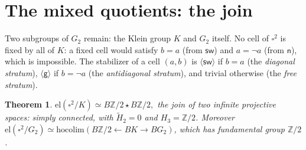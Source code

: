 \documentclass[11pt]{amsart}
\newtheorem{thm}{Theorem}[section]
\theoremstyle{definition}
\newcommand{\el}{\mathrm{el}}
\newcommand{\sw}{\mathsf{sw}}
\newcommand{\nb}{\mathsf{n}}
\newcommand{\gtw}{\mathsf{g}}
\newcommand{\Kl}{K}
\newcommand{\hopush}{\mathrm{hocolim}}
\begin{document}
\section{The mixed quotients: the join}
\label{sec:join}

Two subgroups of $G_2$ remain: the Klein group $\Kl$ and $G_2$
itself.  No cell of $\square^2$ is fixed by all of $\Kl$: a fixed
cell would satisfy $b = a$ (from $\sw$) and $a = \neg a$ (from
$\nb$), which is impossible.  The stabilizer of a cell $(a,b)$ is
$\langle\sw\rangle$ if $b = a$ (the \emph{diagonal stratum}),
$\langle\gtw\rangle$ if $b = \neg a$ (the \emph{antidiagonal
  stratum}), and trivial otherwise (the \emph{free stratum}).

\begin{thm}
  \label{thm:join}
  \(
    \el(\square^2/\Kl) \simeq B\mathbb{Z}/2 \star B\mathbb{Z}/2 ,
  \)
  the join of two infinite projective spaces: simply connected,
  with $\widetilde H_2 = 0$ and $H_3 = \mathbb{Z}/2$.  Moreover
  $\el(\square^2/G_2) \simeq
  \hopush(B\mathbb{Z}/2 \leftarrow B\Kl \to BG_2)$, which has
  fundamental group $\mathbb{Z}/2$.
\end{thm}
\end{document}
